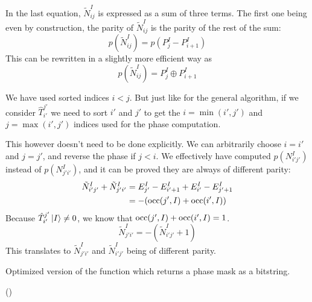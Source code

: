 \documentclass[./thesis.tex]{subfiles}
\begin{document}
In the last equation, $\tilde N^I_{ij}$ is expressed as a sum of three terms. The first one being even by construction, the parity of $\tilde N^I_{ij}$ is the parity of the rest of the sum:
\begin{equation}
p(\tilde N^I_{ij})=p(P^I_j - P^I_{i+1})
\end{equation}
This can be rewritten in a slightly more efficient way as
\begin{equation}
p(\tilde N^I_{ij}) = P^I_j \oplus P^I_{i+1}
\end{equation}


We have used sorted indices $i<j$. But just like for the general algorithm, if we consider $\hat T_{i'}^{j'}$ we need to sort $i'$ and $j'$ to get the $i=\min(i', j')$ and $j=\max(i', j')$ indices used for the phase computation.

This however doesn't need to be done explicitly. We can arbitrarily choose $i=i'$ and $j=j'$, and reverse the phase if $j<i$. We effectively have computed $p(N^I_{i'j'})$ instead of $p(N^I_{j'i'})$, and it can be proved they are always of different parity:
\begin{align}
\tilde N^{I}_{i' j'} + \tilde N^{I}_{j'i'} & = E^{I}_{j'} - E^I_{i'+1} + E^I_{i'} - E^I_{j'+1} \\
& = -\qty( {\text{occ}(j',I)} + {\text{occ}(i',I)})
\end{align}
Because $\hat T_{i'}^{j'} \ket I \neq 0$, we know that ${\text{occ}(j',I)} + {\text{occ}(i',I)} = 1$. 
\begin{equation}
\tilde N^{I}_{j' i'} = -(\tilde N^{I}_{i'j'} + 1)
\end{equation}
This translates to $\tilde N^{I}_{j' i'}$ and $\tilde N^{I}_{i'j'}$ being of different parity.


\begin{algorithm}
	\caption{Optimized version of the function which returns a phase mask as a bitstring.}
	\label{alg:PHASEMASK}	
	
	\Fn(){\FMain{$\bitI$}}{
		   
		 \;
		}
\end{algorithm}
\end{document}
